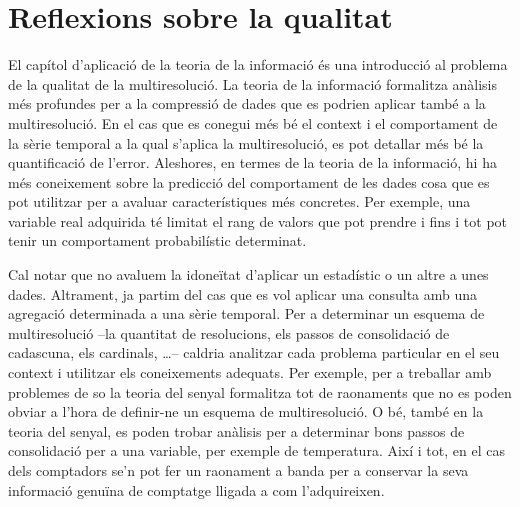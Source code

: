 










\section{Reflexions sobre la qualitat}


El capítol d'aplicació de la teoria de la informació és una
introducció al problema de la qualitat de la multiresolució.  La
teoria de la informació formalitza anàlisis més profundes per a la
compressió de dades que es podrien aplicar també a la multiresolució.
En el cas que es conegui més bé el context i el comportament de la
sèrie temporal a la qual s'aplica la multiresolució, es pot detallar
més bé la quantificació de l'error. Aleshores, en termes de la teoria
de la informació, hi ha més coneixement sobre la predicció
del comportament de les dades cosa que es pot utilitzar per a avaluar
característiques més concretes. Per exemple, una variable real
adquirida té limitat el rang de valors que pot prendre i fins i tot
pot tenir un comportament probabilístic determinat.



Cal notar que no avaluem la idoneïtat d'aplicar un estadístic o un
altre a unes dades. Altrament, ja partim del cas que es vol aplicar
una consulta amb una agregació determinada a una sèrie temporal.
Per a determinar un esquema de multiresolució --la quantitat de
resolucions, els passos de consolidació de cadascuna, els cardinals,
\dots-- caldria analitzar cada problema particular en el seu context i
utilitzar els coneixements adequats. Per exemple, per a treballar amb
problemes de so la teoria del senyal formalitza tot de raonaments que
no es poden obviar a l'hora de definir-ne un esquema de
multiresolució.  O bé, també en la teoria del senyal, es poden trobar
anàlisis per a determinar bons passos de consolidació per a una
variable, per exemple de temperatura. Així i tot, en el cas dels
comptadors se'n pot fer un raonament a banda per a conservar la seva
informació genuïna de comptatge lligada a com l'adquireixen.


